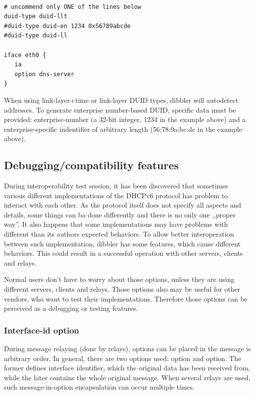 \begin{lstlisting}

# uncommend only ONE of the lines below
duid-type duid-llt
#duid-type duid-en 1234 0x56789abcde
#duid-type duid-ll

iface eth0 {
   ia
   option dns-server
}
\end{lstlisting}

When using link-layer+time or link-layer DUID types, dibbler will
autodetect addresses. To generate enterprise number-based DUID,
specific data must be provided: enterprise-number (a 32-bit integer,
1234 in the example above) and a enterprise-specific indentifier of
arbitrary length (56:78:9a:bc:de in the example above).

\subsection{Debugging/compatibility features}
During interoperability test session, it has been discovered that
sometimes various different implementations of the DHCPv6 protocol has
problem to interact with each other. As the protocol itself does not
specify all aspects and details, some things can ba done differently
and there is no only one ,,proper way''. It also happens that some
implementations may have problems with different than its authors
expected behaviors. To allow better interoperation between such
implementation, dibbler has some features, which cause different
behaviors. This could result in a successful operation with other
servers, clients and relays.

Normal users don't have to worry about those options, unless they are
using different servers, clients and relays. Those options also may be
useful for other vendors, who want to test their
implementations. Therefore those options can be perceived as a
debugging or testing features.

\subsubsection{Interface-id option}

During message relaying (done by relays), options can be placed in the 
message is arbitrary order. In general, there are two options used:
 option and  option. The former
defines interface identifier, which the original data has been
received from, while the later contains the whole original
message. When several relays are used, such message-in-option
encapsulation can occur multiple times.

